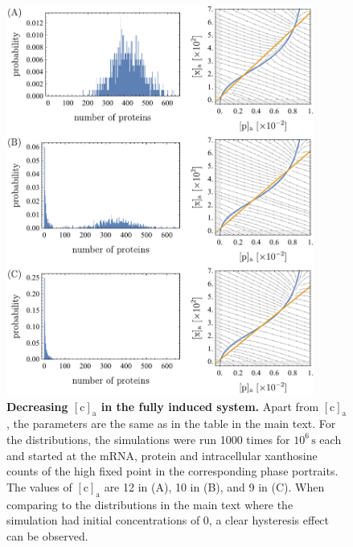 \documentclass[10pt,letterpaper]{article}
\newcommand{\unit}[1]{\,\mathrm{#1}}
\newcommand{\n}[1]{\mathrm{#1}}
\begin{document}
\begin{figure}
	\centering
	\includegraphics[width=0.9\textwidth]{FigSI8.pdf}
	\caption{{\bf Decreasing $\n{[c]_a}$ in the fully induced system.}
		Apart from $\n{[c]_a}$, the parameters are the same as in the table in the main text. For the distributions, the simulations were run 1000 times for $10^6 \unit{s}$ each and started at the mRNA, protein and intracellular xanthosine counts of the high fixed point in the corresponding phase portraits. The values of $\n{[c]_a}$ are 12 in (A), 10 in (B), and 9 in (C). When comparing to the distributions in the main text where the simulation had initial concentrations of 0, a clear hysteresis effect can be observed.}
	\label{figS8:hysteresis}
\end{figure}

\FloatBarrier
\newpage
\end{document}
